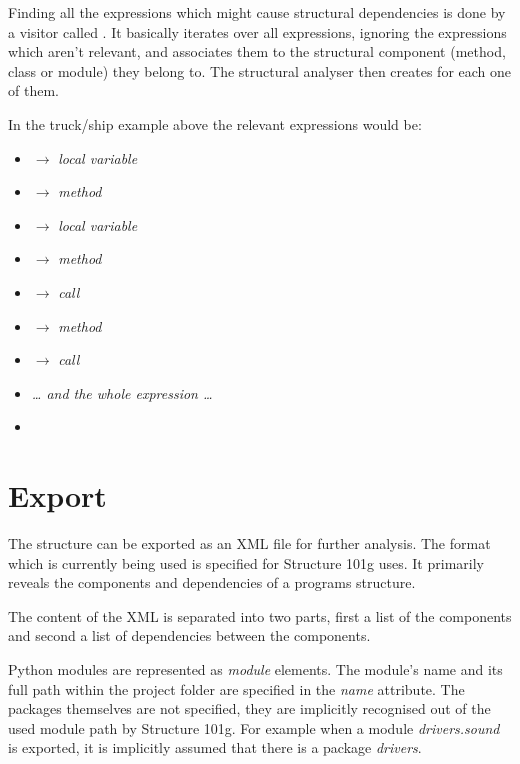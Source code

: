 \documentclass[12pt,halfparskip,DIV11,BCOR10mm]{scrreprt}
\begin{document}
Finding all the expressions which might cause structural dependencies is done by a visitor called . It basically iterates over all expressions, ignoring the expressions which aren't relevant, and associates them to the structural component (method, class or module) they belong to. The structural analyser then creates  for each one of them. 

In the truck/ship example above the relevant expressions would be:

\begin{itemize}
    \item {} $\rightarrow$ \emph{local variable}
    \item {} $\rightarrow$ \emph{method}
    \item {} $\rightarrow$ \emph{local variable}
    \item {} $\rightarrow$ \emph{method}
    \item {} $\rightarrow$ \emph{call}
    \item {} $\rightarrow$ \emph{method}
    \item {} $\rightarrow$ \emph{call}
    \item[] \emph{… and the whole expression …}
    \item {} 
\end{itemize}

\section{Export}

The structure can be exported as an XML file for further analysis. The format which is currently being used is specified for Structure 101g uses. It primarily reveals the components and dependencies of a programs structure. 

The content of the XML is separated into two parts, first a list of the components and second a list of dependencies between the components.

Python modules are represented as \emph{module} elements. The module's name and its full path within the project folder are specified in the \emph{name} attribute. The packages themselves are not specified, they are implicitly recognised out of the used module path by Structure 101g. For example when a module \emph{drivers.sound} is exported, it is implicitly assumed that there is a package \emph{drivers}.
\end{document}
